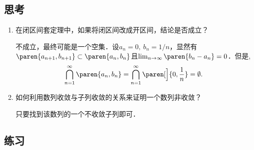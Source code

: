 \subsection*{思考}

\begin{enumerate}
\item 在闭区间套定理中，如果将闭区间改成开区间，结论是否成立？

  \ifshowsolp
    不成立，最终可能是一个空集．设\(a_n = 0,\ b_n = 1/n\)，显然有\(\paren{a_{n+1}, b_{n+1}} \subset \paren{a_n, b_n}\)且\(\lim_{n\to\infty} \paren{b_n - a_n} = 0\)．但是,
    \begin{equation*}
      \bigcap_{n=1}^\infty \paren{a_n, b_n} = \bigcap_{n=1}^\infty \paren[\Big]{0, \frac1n} = \emptyset.
    \end{equation*}
  \fi

\item 如何利用数列收敛与子列收敛的关系来证明一个数列非收敛？

  \ifshowsolp
    只要找到该数列的一个不收敛子列即可．
  \fi
\end{enumerate}

\ifshowex
{}
\subsection*{练习}

